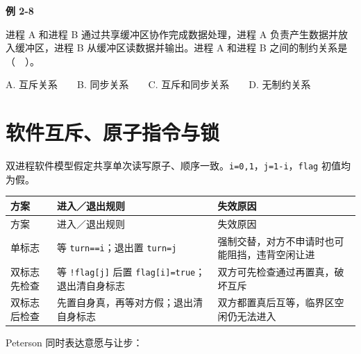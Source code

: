 \par\medskip{}\noindent\hypertarget{OS02-E08}{}\label{OS02-E08}\textbf{例 2-8}\par\nobreak\smallskip

进程 A 和进程 B 通过共享缓冲区协作完成数据处理，进程 A 负责产生数据并放入缓冲区，进程 B 从缓冲区读数据并输出。进程 A 和进程 B 之间的制约关系是（　）。

A. 互斥关系　　B. 同步关系　　C. 互斥和同步关系　　D. 无制约关系

\section{软件互斥、原子指令与锁}\label{OS02-locks}

双进程软件模型假定共享单次读写原子、顺序一致。\texttt{i=\allowbreak{}0,\allowbreak{}1}，\texttt{j=\allowbreak{}1-i}，\texttt{flag} 初值均为假。

\par\smallskip
\begin{wideblock}
{\fontsize{9.3}{12}\selectfont\setlength{\tabcolsep}{2.5pt}\setlength{\LTleft}{0pt}\setlength{\LTright}{0pt}
\begin{longtable}{@{}>{\raggedright\arraybackslash}p{}>{\raggedright\arraybackslash}p{}>{\raggedright\arraybackslash}p{}@{}}
\toprule
方案 & 进入／退出规则 & 失效原因 \\

\midrule\endfirsthead\toprule
方案 & 进入／退出规则 & 失效原因 \\

\midrule\endhead\bottomrule\endfoot
单标志 & 等 \texttt{turn==i}；退出置 \texttt{turn=j} & 强制交替，对方不申请时也可能阻挡，违背空闲让进 \\

双标志先检查 & 等 \texttt{!flag{[}j{]}} 后置 \texttt{flag{[}i{]}=true}；退出清自身标志 & 双方可先检查通过再置真，破坏互斥 \\

双标志后检查 & 先置自身真，再等对方假；退出清自身标志 & 双方都置真后互等，临界区空闲仍无法进入 \\

\end{longtable}}
\end{wideblock}
\par\smallskip

Peterson 同时表达意愿与让步：

